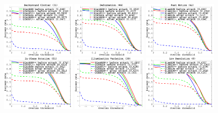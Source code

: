 \documentclass[12pt]{article}
\begin{document}
\begin{figure}[t!]
  \renewcommand\thefigure{9}
  \begin{center}
    \includegraphics[width=0.32\textwidth]{images_imperceptible/OTB2015/success_plot_OPE_OTB100_BC.png}
    \includegraphics[width=0.32\textwidth]{images_imperceptible/OTB2015/success_plot_OPE_OTB100_DEF.png}
    \includegraphics[width=0.32\textwidth]{images_imperceptible/OTB2015/success_plot_OPE_OTB100_FM.png}
    \includegraphics[width=0.32\textwidth]{images_imperceptible/OTB2015/success_plot_OPE_OTB100_IPR.png}
    \includegraphics[width=0.32\textwidth]{images_imperceptible/OTB2015/success_plot_OPE_OTB100_IV.png}
    \includegraphics[width=0.32\textwidth]{images_imperceptible/OTB2015/success_plot_OPE_OTB100_LR.png}

\end{center}
\end{figure}
\end{document}
